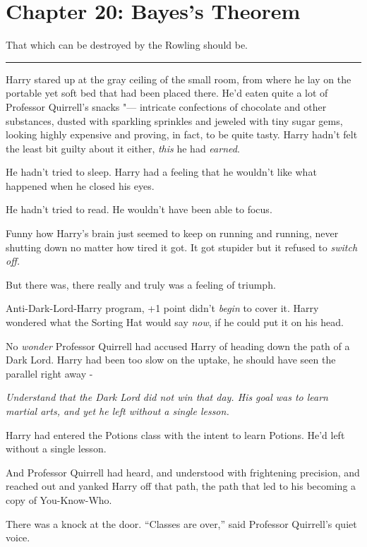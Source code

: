 \chapter{Chapter 20: Bayes's Theorem}
That which can be destroyed by the Rowling should be.

\begin{center}\rule{3in}{0.4pt}\end{center}

Harry stared up at the gray ceiling of the small room, from where he lay
on the portable yet soft bed that had been placed there. He'd eaten
quite a lot of Professor Quirrell's snacks "--- intricate confections of
chocolate and other substances, dusted with sparkling sprinkles and
jeweled with tiny sugar gems, looking highly expensive and proving, in
fact, to be quite tasty. Harry hadn't felt the least bit guilty about it
either, \emph{this} he had \emph{earned}.

He hadn't tried to sleep. Harry had a feeling that he wouldn't like what
happened when he closed his eyes.

He hadn't tried to read. He wouldn't have been able to focus.

Funny how Harry's brain just seemed to keep on running and running,
never shutting down no matter how tired it got. It got stupider but it
refused to \emph{switch off.}

But there was, there really and truly was a feeling of triumph.

Anti-Dark-Lord-Harry program, +1 point didn't \emph{begin} to cover it.
Harry wondered what the Sorting Hat would say \emph{now}, if he could
put it on his head.

No \emph{wonder} Professor Quirrell had accused Harry of heading down
the path of a Dark Lord. Harry had been too slow on the uptake, he
should have seen the parallel right away -

\emph{Understand that the Dark Lord did not win that day. His goal was
to learn martial arts, and yet he left without a single lesson.}

Harry had entered the Potions class with the intent to learn Potions.
He'd left without a single lesson.

And Professor Quirrell had heard, and understood with frightening
precision, and reached out and yanked Harry off that path, the path that
led to his becoming a copy of You-Know-Who.

There was a knock at the door. ``Classes are over,'' said Professor
Quirrell's quiet voice.

